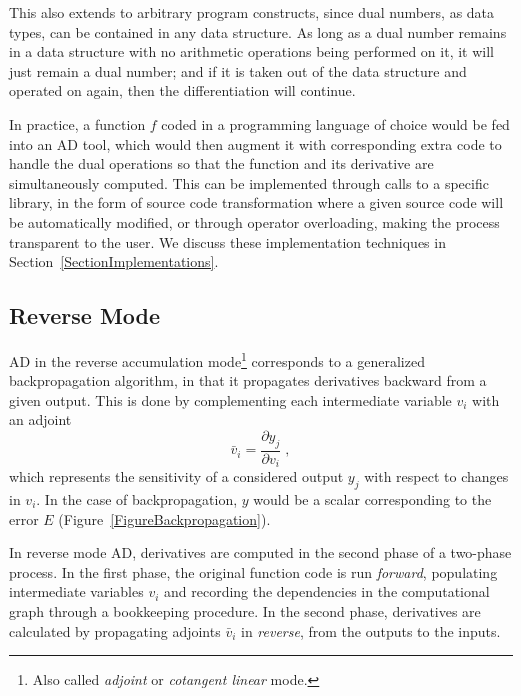 \documentclass[twoside,11pt]{article}
\begin{document}
This also extends to arbitrary program constructs, since dual numbers, as data types, can be contained in any data structure. As long as a dual number remains in a data structure with no arithmetic operations being performed on it, it will just remain a dual number; and if it is taken out of the data structure and operated on again, then the differentiation will continue.

In practice, a function $f$ coded in a programming language of choice would be fed into an AD tool, which would then augment it with corresponding extra code to handle the dual operations so that the function and its derivative are simultaneously computed. This can be implemented through calls to a specific library, in the form of source code transformation where a given source code will be automatically modified, or through operator overloading, making the process transparent to the user. We discuss these implementation techniques in Section~\ref{SectionImplementations}.

\subsection{Reverse Mode}
\label{sec:reverse-mode}

AD in the reverse accumulation mode\footnote{Also called \emph{adjoint} or \emph{cotangent linear} mode.} corresponds to a generalized backpropagation algorithm, in that it propagates derivatives backward from a given output. This is done by complementing each intermediate variable $v_i$ with an adjoint
\begin{equation*}
  \bar{v}_i = \frac{\partial y_j}{\partial v_i}\; ,
\end{equation*}
which represents the sensitivity of a considered output $y_j$ with respect to changes in $v_i$. In the case of backpropagation, $y$ would be a scalar corresponding to the error $E$ (Figure~\ref{FigureBackpropagation}).

In reverse mode AD, derivatives are computed in the second phase of a two-phase process. In the first phase, the original function code is run \emph{forward}, populating intermediate variables $v_i$ and recording the dependencies in the computational graph through a bookkeeping procedure. In the second phase, derivatives are calculated by propagating adjoints $\bar{v}_i$ in \emph{reverse}, from the outputs to the inputs.
\end{document}
